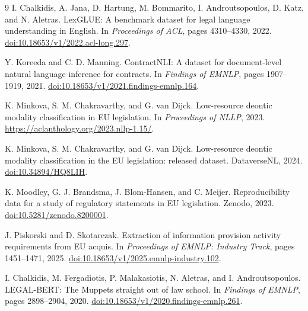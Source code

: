 \documentclass[11pt,a4paper]{article}
\begin{document}
\begin{thebibliography}{9}
I. Chalkidis, A. Jana, D. Hartung, M. Bommarito, I. Androutsopoulos, D. Katz, and N. Aletras.
LexGLUE: A benchmark dataset for legal language understanding in English.
In \emph{Proceedings of ACL}, pages 4310--4330, 2022.
\href{https://doi.org/10.18653/v1/2022.acl-long.297}{doi:10.18653/v1/2022.acl-long.297}.

Y. Koreeda and C. D. Manning.
ContractNLI: A dataset for document-level natural language inference for contracts.
In \emph{Findings of EMNLP}, pages 1907--1919, 2021.
\href{https://doi.org/10.18653/v1/2021.findings-emnlp.164}{doi:10.18653/v1/2021.findings-emnlp.164}.

K. Minkova, S. M. Chakravarthy, and G. van Dijck.
Low-resource deontic modality classification in EU legislation.
In \emph{Proceedings of NLLP}, 2023.
\url{https://aclanthology.org/2023.nllp-1.15/}.

K. Minkova, S. M. Chakravarthy, and G. van Dijck.
Low-resource deontic modality classification in the EU legislation: released dataset.
DataverseNL, 2024.
\href{https://doi.org/10.34894/HQ8LIH}{doi:10.34894/HQ8LIH}.

K. Moodley, G. J. Brandsma, J. Blom-Hansen, and C. Meijer.
Reproducibility data for a study of regulatory statements in EU legislation.
Zenodo, 2023.
\href{https://doi.org/10.5281/zenodo.8200001}{doi:10.5281/zenodo.8200001}.

J. Piskorski and D. Skotarczak.
Extraction of information provision activity requirements from EU acquis.
In \emph{Proceedings of EMNLP: Industry Track}, pages 1451--1471, 2025.
\href{https://doi.org/10.18653/v1/2025.emnlp-industry.102}{doi:10.18653/v1/2025.emnlp-industry.102}.

I. Chalkidis, M. Fergadiotis, P. Malakasiotis, N. Aletras, and I. Androutsopoulos.
LEGAL-BERT: The Muppets straight out of law school.
In \emph{Findings of EMNLP}, pages 2898--2904, 2020.
\href{https://doi.org/10.18653/v1/2020.findings-emnlp.261}{doi:10.18653/v1/2020.findings-emnlp.261}.
\end{thebibliography}
\end{document}
